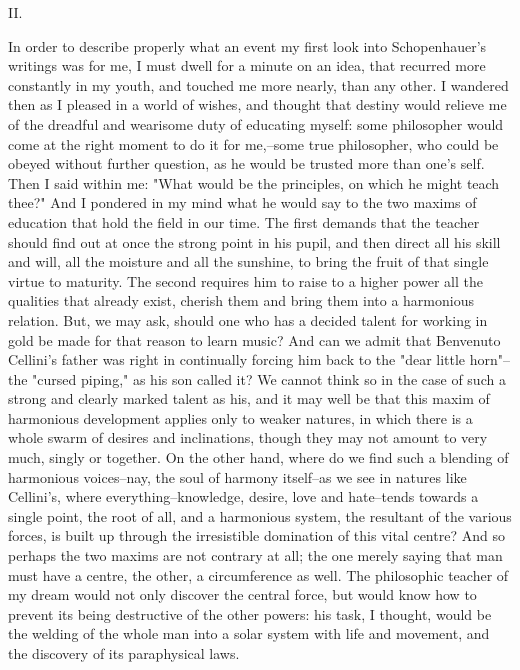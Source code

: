 II.

In order to describe properly what an event my first look into
Schopenhauer's writings was for me, I must dwell for a minute on an
idea, that recurred more constantly in my youth, and touched me more
nearly, than any other. I wandered then as I pleased in a world of
wishes, and thought that destiny would relieve me of the dreadful and
wearisome duty of educating myself: some philosopher would come at
the right moment to do it for me,--some true philosopher, who could
be obeyed without further question, as he would be trusted more than
one's self. Then I said within me: "What would be the principles, on
which he might teach thee?" And I pondered in my mind what he would
say to the two maxims of education that hold the field in our time.
The first demands that the teacher should find out at once the strong
point in his pupil, and then direct all his skill and will, all the
moisture and all the sunshine, to bring the fruit of that single
virtue to maturity. The second requires him to raise to a higher
power all the qualities that already exist, cherish them and bring
them into a harmonious relation. But, we may ask, should one who has
a decided talent for working in gold be made for that reason to learn
music? And can we admit that Benvenuto Cellini's father was right in
continually forcing him back to the "dear little horn"--the "cursed
piping," as his son called it? We cannot think so in the case of such
a strong and clearly marked talent as his, and it may well be that
this maxim of harmonious development applies only to weaker natures,
in which there is a whole swarm of desires and inclinations, though
they may not amount to very much, singly or together. On the other
hand, where do we find such a blending of harmonious voices--nay, the
soul of harmony itself--as we see in natures like Cellini's, where
everything--knowledge, desire, love and hate--tends towards a single
point, the root of all, and a harmonious system, the resultant of the
various forces, is built up through the irresistible domination of
this vital centre? And so perhaps the two maxims are not contrary at
all; the one merely saying that man must have a centre, the other, a
circumference as well. The philosophic teacher of my dream would not
only discover the central force, but would know how to prevent its
being destructive of the other powers: his task, I thought, would be
the welding of the whole man into a solar system with life and
movement, and the discovery of its paraphysical laws.


